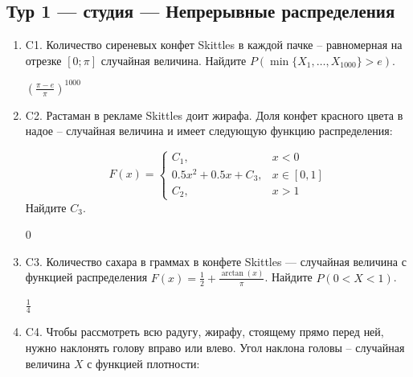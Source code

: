 \documentclass[12pt]{article}
\def \P{P}
\newenvironment{problem}{}{}
\newenvironment{sol}{}{} %
\begin{document}
\newpage
\subsection{Тур 1 — студия — Непрерывные распределения}

\begin{enumerate}
\begin{problem}
\item[C1.] Количество сиреневых конфет Skittles в каждой пачке – равномерная на отрезке $[0; \pi]$ случайная величина. Найдите $\P(\min\{X_1, \ldots, X_{1000}\} > e)$.

\begin{sol}
$\left(\frac{\pi - e}{\pi}\right)^{1000}$
\end{sol}
\end{problem}

\begin{problem}
\item[C2.] Растаман в рекламе Skittles доит жирафа. Доля конфет красного цвета в надое – случайная величина и имеет следующую функцию распределения:

\[
F(x)  = \begin{cases}
C_1, & x < 0 \\
0.5 x^2 + 0.5x + C_3, & x\in [0,1] \\
C_2, & x > 1
\end{cases}
\]
Найдите $C_3$.

\begin{sol}
$0$
\end{sol}
\end{problem}

\begin{problem}
\item[C3.] Количество сахара в граммах в конфете Skittles — случайная величина с функцией распределения $F(x) = \frac{1}{2} + \frac{\arctan(x)}{\pi}$. Найдите $\P(0<X<1)$.

\begin{sol}
$\frac{1}{4}$
\end{sol}
\end{problem}

\begin{problem}
\item[C4.] Чтобы рассмотреть всю радугу, жирафу, стоящему прямо перед ней, нужно наклонять голову вправо или влево. Угол наклона головы – случайная величина $X$ с функцией плотности:


\end{problem}
\end{enumerate}
\end{document}
